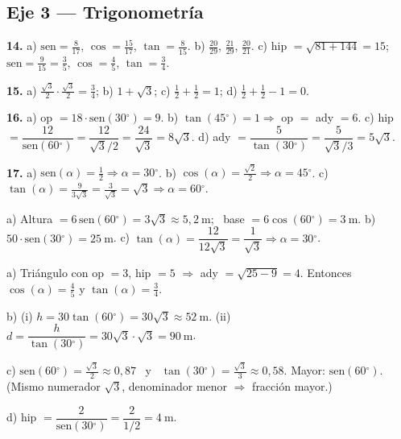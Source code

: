 \documentclass[11pt,a4paper]{article}
\newcommand{\gr}{\ensuremath{^{\circ}}}
\begin{document}
\subsection*{Eje 3 --- Trigonometría}

\begin{tcolorbox}[propiedad, title={Ejercicios 14 y 15}]
\textbf{14.} a) $\mathrm{sen} = \tfrac{8}{17}$, $\cos = \tfrac{15}{17}$, $\tan = \tfrac{8}{15}$. \quad
b) $\tfrac{20}{29}$, $\tfrac{21}{29}$, $\tfrac{20}{21}$. \quad
c) hip $= \sqrt{81+144} = 15$; \ $\mathrm{sen} = \tfrac{9}{15} = \tfrac{3}{5}$, $\cos = \tfrac{4}{5}$, $\tan = \tfrac{3}{4}$.

\smallskip
\textbf{15.} a) $\tfrac{\sqrt{3}}{2}\cdot\tfrac{\sqrt{3}}{2} = \tfrac{3}{4}$; \quad
b) $1 + \sqrt{3}$; \quad
c) $\tfrac{1}{2} + \tfrac{1}{2} = 1$; \quad
d) $\tfrac{1}{2} + \tfrac{1}{2} - 1 = 0$.
\end{tcolorbox}

\begin{tcolorbox}[propiedad, title={Ejercicios 16 y 17}]
\textbf{16.} a) op $= 18\cdot\mathrm{sen}(30\gr ) = 9$. \quad
b) $\tan(45\gr ) = 1 \Rightarrow$ op $=$ ady $= 6$. \quad
c) hip $= \dfrac{12}{\mathrm{sen}(60\gr )} = \dfrac{12}{\sqrt{3}/2} = \dfrac{24}{\sqrt{3}} = 8\sqrt{3}$. \quad
d) ady $= \dfrac{5}{\tan(30\gr )} = \dfrac{5}{\sqrt{3}/3} = 5\sqrt{3}$.

\smallskip
\textbf{17.} a) $\mathrm{sen}(\alpha) = \tfrac{1}{2} \Rightarrow \alpha = 30\gr $. \quad
b) $\cos(\alpha) = \tfrac{\sqrt{2}}{2} \Rightarrow \alpha = 45\gr $. \quad
c) $\tan(\alpha) = \tfrac{9}{3\sqrt{3}} = \tfrac{3}{\sqrt{3}} = \sqrt{3} \Rightarrow \alpha = 60\gr $.
\end{tcolorbox}

\begin{tcolorbox}[propiedad, title={Ejercicio 18}]
a) Altura $= 6\,\mathrm{sen}(60\gr ) = 3\sqrt{3} \approx 5{,}2\ \text{m}$; \ base $= 6\cos(60\gr ) = 3\ \text{m}$. \quad
b) $50\cdot\mathrm{sen}(30\gr ) = 25\ \text{m}$. \quad
c) $\tan(\alpha) = \dfrac{12}{12\sqrt{3}} = \dfrac{1}{\sqrt{3}} \Rightarrow \alpha = 30\gr $.
\end{tcolorbox}

\begin{tcolorbox}[propiedad, title={Ejercicio 19 (desafíos)}]
a) Triángulo con op $= 3$, hip $= 5$ $\Rightarrow$ ady $= \sqrt{25-9} = 4$.
Entonces $\cos(\alpha) = \tfrac{4}{5}$ y $\tan(\alpha) = \tfrac{3}{4}$.

\smallskip
b) (i) $h = 30\tan(60\gr ) = 30\sqrt{3} \approx 52\ \text{m}$.
(ii) $d = \dfrac{h}{\tan(30\gr )} = 30\sqrt{3}\cdot\sqrt{3} = 90\ \text{m}$.

\smallskip
c) $\mathrm{sen}(60\gr ) = \tfrac{\sqrt{3}}{2} \approx 0{,}87$ \ y \ $\tan(30\gr ) = \tfrac{\sqrt{3}}{3} \approx 0{,}58$.
Mayor: $\mathrm{sen}(60\gr )$. (Mismo numerador $\sqrt{3}$, denominador menor $\Rightarrow$ fracción mayor.)

\smallskip
d) hip $= \dfrac{2}{\mathrm{sen}(30\gr )} = \dfrac{2}{1/2} = 4\ \text{m}$.
\end{tcolorbox}
\end{document}
